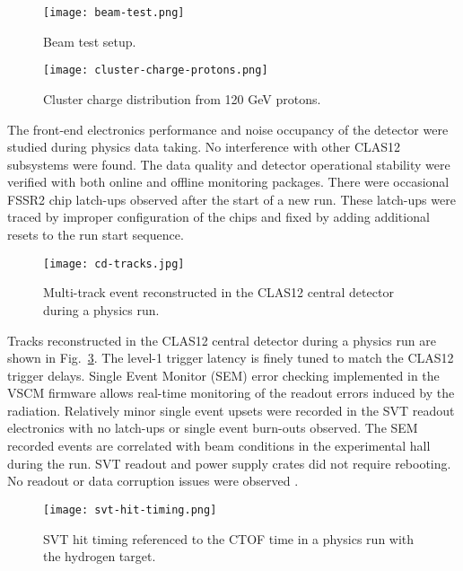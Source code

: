 \begin{figure}[hbt] 
\centering 
\texttt{[image: beam-test.png]}
\caption{Beam test setup.}
\label{fig:beam-test}
\end{figure}

\begin{figure}[h] 
\centering 
\texttt{[image: cluster-charge-protons.png]}
\caption{Cluster charge distribution from 120 GeV protons.}
\label{fig:cluster-charge-protons}
\end{figure}

The front-end electronics performance and noise occupancy of the detector were studied during physics data taking. No interference with other CLAS12 subsystems were found. The data quality and detector operational stability  were verified with both online and offline monitoring packages. There were occasional FSSR2 chip latch-ups observed after the start of a new run. These latch-ups were traced by improper configuration of the chips and fixed by adding additional resets to the run start sequence.

\begin{figure}[h] 
\centering 
\texttt{[image: cd-tracks.jpg]}
\caption{Multi-track event reconstructed in the CLAS12 central detector during a physics run.}
\label{fig:cd-tracks}
\end{figure}

Tracks reconstructed in the CLAS12 central detector during a physics run are shown in Fig.~\ref{fig:cd-tracks}. The level-1 trigger latency is finely tuned to match the CLAS12 trigger delays. Single Event Monitor (SEM) error checking implemented in the VSCM firmware allows real-time monitoring of the readout errors induced by the radiation. Relatively minor single event upsets were recorded in the SVT readout electronics with no latch-ups or single event burn-outs observed. The SEM recorded events are correlated with beam conditions in the experimental hall during the run. SVT readout and power supply crates did not require rebooting. No readout or data corruption issues were observed \cite{SEENOTE}. 

\begin{figure}[htb] 
\centering 
\texttt{[image: svt-hit-timing.png]}
\caption{SVT hit timing referenced to the CTOF time in a physics run with the hydrogen target.}
\label{fig:svt-hit-timing}
\end{figure}

